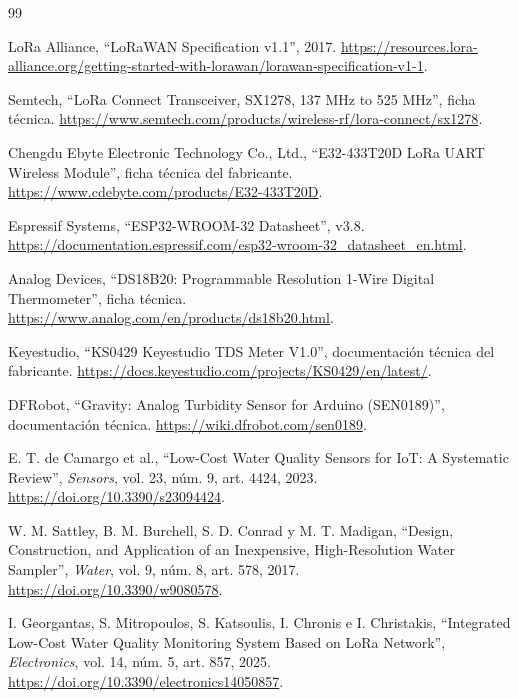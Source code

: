 \documentclass[11pt,a4paper]{article}
\begin{document}
\begin{thebibliography}{99}
\setlength{\itemsep}{1pt}
\setlength{\parskip}{0pt}
\small


LoRa Alliance,
``LoRaWAN Specification v1.1'',
2017.
\url{https://resources.lora-alliance.org/getting-started-with-lorawan/lorawan-specification-v1-1}.

Semtech,
``LoRa Connect Transceiver, SX1278, 137 MHz to 525 MHz'',
ficha técnica.
\url{https://www.semtech.com/products/wireless-rf/lora-connect/sx1278}.

Chengdu Ebyte Electronic Technology Co., Ltd.,
``E32-433T20D LoRa UART Wireless Module'',
ficha técnica del fabricante.
\url{https://www.cdebyte.com/products/E32-433T20D}.

Espressif Systems,
``ESP32-WROOM-32 Datasheet'',
v3.8.
\url{https://documentation.espressif.com/esp32-wroom-32_datasheet_en.html}.

Analog Devices,
``DS18B20: Programmable Resolution 1-Wire Digital Thermometer'',
ficha técnica.
\url{https://www.analog.com/en/products/ds18b20.html}.

Keyestudio,
``KS0429 Keyestudio TDS Meter V1.0'',
documentación técnica del fabricante.
\url{https://docs.keyestudio.com/projects/KS0429/en/latest/}.

DFRobot,
``Gravity: Analog Turbidity Sensor for Arduino (SEN0189)'',
documentación técnica.
\url{https://wiki.dfrobot.com/sen0189}.


E. T. de Camargo et al.,
``Low-Cost Water Quality Sensors for IoT: A Systematic Review'',
\emph{Sensors},
vol. 23, núm. 9, art. 4424, 2023.
\url{https://doi.org/10.3390/s23094424}.

W. M. Sattley, B. M. Burchell, S. D. Conrad y M. T. Madigan,
``Design, Construction, and Application of an Inexpensive, High-Resolution Water Sampler'',
\emph{Water},
vol. 9, núm. 8, art. 578, 2017.
\url{https://doi.org/10.3390/w9080578}.

I. Georgantas, S. Mitropoulos, S. Katsoulis, I. Chronis e I. Christakis,
``Integrated Low-Cost Water Quality Monitoring System Based on LoRa Network'',
\emph{Electronics},
vol. 14, núm. 5, art. 857, 2025.
\url{https://doi.org/10.3390/electronics14050857}.


\end{thebibliography}
\end{document}
